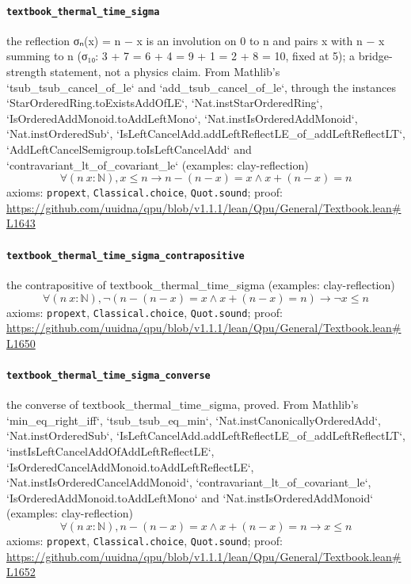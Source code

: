 \documentclass[11pt]{article}
\begin{document}
\paragraph{\texttt{textbook\_thermal\_time\_sigma}}
the reflection σₙ(x) = n − x is an involution on 0 to n and pairs x with n − x summing to n (σ₁₀: 3 + 7 = 6 + 4 = 9 + 1 = 2 + 8 = 10, fixed at 5); a bridge-strength statement, not a physics claim. From Mathlib's `tsub\_tsub\_cancel\_of\_le` and `add\_tsub\_cancel\_of\_le`, through the instances `StarOrderedRing.toExistsAddOfLE`, `Nat.instStarOrderedRing`, `IsOrderedAddMonoid.toAddLeftMono`, `Nat.instIsOrderedAddMonoid`, `Nat.instOrderedSub`, `IsLeftCancelAdd.addLeftReflectLE\_of\_addLeftReflectLT`, `AddLeftCancelSemigroup.toIsLeftCancelAdd` and `contravariant\_lt\_of\_covariant\_le` (examples: clay-reflection)
\[ \forall (n\ x : \mathbb{N}), x \le n \to n - (n - x) = x \land x + (n - x) = n \]
\noindent axioms: \texttt{propext}, \texttt{Classical.choice}, \texttt{Quot.sound}; proof: \url{https://github.com/uuidna/qpu/blob/v1.1.1/lean/Qpu/General/Textbook.lean\#L1643}

\paragraph{\texttt{textbook\_thermal\_time\_sigma\_contrapositive}}
the contrapositive of textbook\_thermal\_time\_sigma (examples: clay-reflection)
\[ \forall (n\ x : \mathbb{N}), \neg (n - (n - x) = x \land x + (n - x) = n) \to \neg x \le n \]
\noindent axioms: \texttt{propext}, \texttt{Classical.choice}, \texttt{Quot.sound}; proof: \url{https://github.com/uuidna/qpu/blob/v1.1.1/lean/Qpu/General/Textbook.lean\#L1650}

\paragraph{\texttt{textbook\_thermal\_time\_sigma\_converse}}
the converse of textbook\_thermal\_time\_sigma, proved. From Mathlib's `min\_eq\_right\_iff`, `tsub\_tsub\_eq\_min`, `Nat.instCanonicallyOrderedAdd`, `Nat.instOrderedSub`, `IsLeftCancelAdd.addLeftReflectLE\_of\_addLeftReflectLT`, `instIsLeftCancelAddOfAddLeftReflectLE`, `IsOrderedCancelAddMonoid.toAddLeftReflectLE`, `Nat.instIsOrderedCancelAddMonoid`, `contravariant\_lt\_of\_covariant\_le`, `IsOrderedAddMonoid.toAddLeftMono` and `Nat.instIsOrderedAddMonoid` (examples: clay-reflection)
\[ \forall (n\ x : \mathbb{N}), n - (n - x) = x \land x + (n - x) = n \to x \le n \]
\noindent axioms: \texttt{propext}, \texttt{Classical.choice}, \texttt{Quot.sound}; proof: \url{https://github.com/uuidna/qpu/blob/v1.1.1/lean/Qpu/General/Textbook.lean\#L1652}
\end{document}
